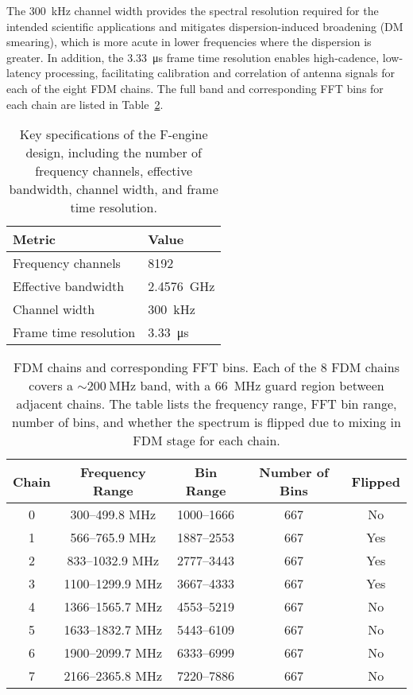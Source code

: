The \SI{300}{\kilo\hertz} channel width provides the spectral resolution required for the intended scientific applications and mitigates dispersion-induced broadening (DM smearing), which is more acute in lower frequencies where the dispersion is greater. In addition, the \SI{3.33}{\micro\second} frame time resolution enables high-cadence, low-latency processing, facilitating calibration and correlation of antenna signals for each of the eight FDM chains. The full band and corresponding FFT bins for each chain are listed in Table~\ref{tab:fdm_chains}.
\begin{table}[htbp]
\centering
\begin{tabular}{l l}
\hline
Metric & Value \\
\hline
Frequency channels & 8192 \\
Effective bandwidth & \SI{2.4576}{\giga\hertz} \\
Channel width & \SI{300}{\kilo\hertz} \\
Frame time resolution & \SI{3.33}{\micro\second}  \\
\hline
\end{tabular}
\caption[F-engine specifications]{Key specifications of the F-engine design, including the number of frequency channels, effective bandwidth, channel width, and frame time resolution.}
\label{tab:f_engine_metrics}
\end{table}

\begin{table}[htbp]
\centering
\begin{tabular}{ccccc}
\toprule
Chain & Frequency Range & Bin Range & Number of Bins & Flipped \\
\midrule
0 & 300--499.8 MHz   & 1000--1666 & 667 & No \\
1 & 566--765.9 MHz   & 1887--2553 & 667 & Yes \\
2 & 833--1032.9 MHz  & 2777--3443 & 667 & Yes \\
3 & 1100--1299.9 MHz & 3667--4333 & 667 & Yes \\
4 & 1366--1565.7 MHz & 4553--5219 & 667 & No \\
5 & 1633--1832.7 MHz & 5443--6109 & 667 & No \\
6 & 1900--2099.7 MHz & 6333--6999 & 667 & No \\
7 & 2166--2365.8 MHz & 7220--7886 & 667 & No\\
\bottomrule
\end{tabular}
\caption[FDM chains and corresponding FFT bins]{FDM chains and corresponding FFT bins. Each of the 8 FDM chains covers a $\sim\SI{200}{\mega\hertz}$ band, with a \SI{66}{\mega\hertz} guard region between adjacent chains. The table lists the frequency range, FFT bin range, number of bins, and whether the spectrum is flipped due to mixing in FDM stage for each chain.}
\label{tab:fdm_chains}
\end{table}

